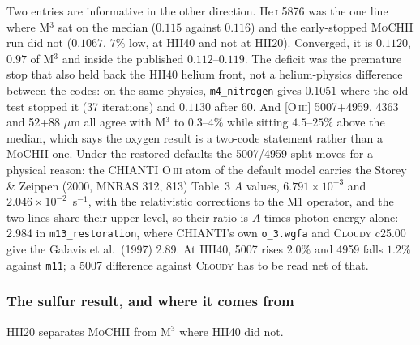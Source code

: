 \documentclass[english,a4paper]{my_memo}
\newcommand{\code}[1]{\texttt{#1}}
\newcommand{\MoCHII}{\textsc{MoCHII}}
\newcommand{\Mthree}{M$^3$}
\newcommand{\Cloudy}{\textsc{Cloudy}}
\newcommand{\HeI}{He\,\textsc{i}}
\begin{document}
Two entries are informative in the other direction.  \HeI{} 5876 was the one
line where \Mthree{} sat on the median ($0.115$ against $0.116$) and the
early-stopped \MoCHII{} run did not ($0.1067$, $7\%$ low, at HII40 and not at
HII20).  Converged, it is $0.1120$, $0.97$ of \Mthree{} and inside the
published $0.112$--$0.119$.  The deficit was the premature stop that also held
back the HII40 helium front, not a helium-physics difference between the codes:
on the same physics, \code{m4\_nitrogen} gives $0.1051$ where the old test
stopped it (37 iterations) and $0.1130$ after 60.
And [O\,\textsc{iii}] 5007+4959, 4363 and 52+88 $\mu$m all agree with
\Mthree{} to $0.3$--$4\%$ while sitting $4.5$--$25\%$ above the median, which
says the oxygen result is a two-code statement rather than a \MoCHII{} one.
Under the restored defaults the 5007/4959 split moves for a physical reason:
the CHIANTI O\,\textsc{iii} atom of the default model carries the
Storey \& Zeippen (2000, MNRAS 312, 813) Table~3 $A$ values,
$6.791\times10^{-3}$ and $2.046\times10^{-2}$~s$^{-1}$, with the
relativistic corrections to the M1 operator, and the two lines share their
upper level, so their ratio is $A$ times photon energy alone: 2.984 in
\code{m13\_restoration}, where CHIANTI's own \code{o\_3.wgfa} and \Cloudy{}
c25.00 give the Galavis et al.\ (1997) 2.89.  At HII40, 5007 rises $2.0\%$
and 4959 falls $1.2\%$ against \code{m11}; a 5007 difference against
\Cloudy{} has to be read net of that.

\subsubsection*{The sulfur result, and where it comes from}

HII20 separates \MoCHII{} from \Mthree{} where HII40 did not.
\end{document}
